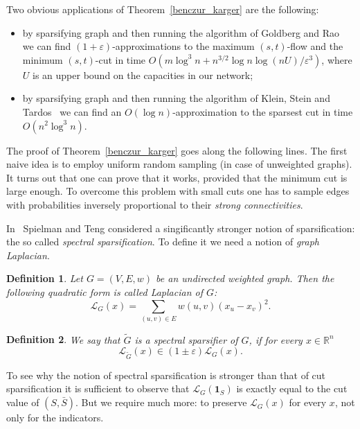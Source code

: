 \documentclass[12pt]{article}
\newcommand{\Rbb}{\mathbb{R}}
\newcommand{\eps}{\varepsilon}
\newtheorem{definition}{Definition}
\begin{document}
    Two obvious applications of Theorem~\ref{benczur_karger} are the following:
    \begin{itemize}
        \item by sparsifying graph and then running the algorithm of Goldberg and Rao~\cite{GR98} we can find
        $(1 + \eps)$-approximations to the maximum $(s, t)$-flow and the minimum $(s, t)$-cut in time
        $O(m \log^3 n + n^{3/2} \log n \log(nU) / \eps^3)$, where $U$ is an upper bound on the capacities in our network;
        \item by sparsifying graph and then running the algorithm of Klein, Stein and Tardos~\cite{KST90} we can find
        an $O(\log n)$-approximation to the sparsest cut in time $O(n^2 \log^3 n)$.
    \end{itemize}

    The proof of Theorem~\ref{benczur_karger} goes along the following lines. The first naive idea is to employ uniform
    random sampling (in case of unweighted graphs).
    It turns out that one can prove that it works, provided that the minimum cut is large enough.
    To overcome this problem with small cuts one has to sample edges with probabilities inversely proportional to their
    \emph{strong connectivities}.

    In~\cite{ST11} Spielman and Teng considered a singificantly stronger notion of sparsification: the so called
    \emph{spectral sparsification}. To define it we need a notion of \emph{graph Laplacian}.

    \begin{definition}
        Let $G = (V, E, w)$ be an undirected weighted graph. Then the following quadratic form is called \emph{Laplacian}
        of $G$:
        $$
            \mathcal{L}_G(x) = \sum_{(u, v) \in E} w(u, v) (x_u - x_v)^2.
        $$
    \end{definition}
    \begin{definition}
        We say that $\tilde{G}$ is a spectral sparsifier of $G$, if for every $x \in \Rbb^n$
        $$
            \mathcal{L}_{\tilde{G}}(x) \in (1 \pm \eps) \mathcal{L}_G(x).
        $$
    \end{definition}

    To see why the notion of spectral sparsification is stronger than that of cut sparsification it is sufficient to observe
    that $\mathcal{L}_G(\mathbf{1}_S)$ is exactly equal to the cut value of $(S, \bar{S})$.
    But we require much more: to preserve $\mathcal{L}_G(x)$ for every $x$, not only for the indicators.
\end{document}
